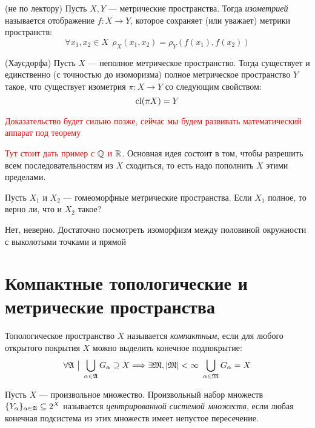 \begin{definition} (не по лектору)
	Пусть $X, Y$ --- метрические пространства. Тогда \textit{изометрией} называется отображение $f \colon X \to Y$, которое сохраняет (или уважает) метрики пространств:
	\[
		\forall x_1, x_2 \in X\ \ \rho_X(x_1, x_2) = \rho_Y(f(x_1), f(x_2))
	\]
\end{definition}

\begin{theorem} (Хаусдорфа)
	Пусть $X$ --- неполное метрическое пространство. Тогда существует и единственно (с точностью до изоморизма) полное метрическое пространство $Y$ такое, что существует изометрия $\pi \colon X \to Y$ со следующим свойством:
	\[
		\operatorname{cl}(\pi X) = Y
	\]
\end{theorem}

\textcolor{red}{Доказательство будет сильно позже, сейчас мы будем развивать математический аппарат под теорему}

\begin{note}
	\textcolor{red}{Тут стоит дать пример с $\mathbb{Q}$ и $\mathbb{R}$}. Основная идея состоит в том, чтобы разрешить всем последовательностям из $X$ сходиться, то есть надо пополнить $X$ этими пределами.
\end{note}

\begin{exercise}
	Пусть $X_1$ и $X_2$ --- гомеоморфные метрические пространства. Если $X_1$ полное, то верно ли, что и $X_2$ такое?
\end{exercise}

\begin{solution}
	Нет, неверно. Достаточно посмотреть изоморфизм между половиной окружности с выколотыми точками и прямой
\end{solution}

\section{Компактные топологические и метрические пространства}

\begin{definition}
	Топологическое пространство $X$ называется \textit{компактным}, если для любого открытого покрытия $X$ можно выделить конечное подпокрытие:
	\[
		\forall \gA \such \bigcup_{\alpha \in \gA} G_\alpha \supseteq X \Lora \exists \gM, |\gM| < \infty\ \bigcup_{\alpha \in \gM} G_\alpha = X
	\]
\end{definition}

\begin{definition}
	Пусть $X$ --- произвольное множество. Произвольный набор множеств $\{Y_\alpha\}_{\alpha \in \mathfrak{A}} \subseteq 2^X$ называется \textit{центрированной системой множеств}, если любая конечная подсистема из этих множеств имеет непустое пересечение.
\end{definition}

